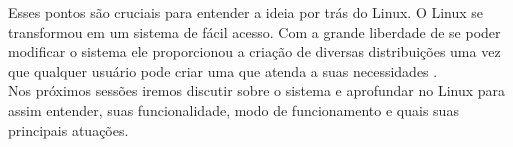 Esses pontos são cruciais para entender a ideia por trás do Linux. O Linux se transformou em um sistema de fácil acesso. Com a grande liberdade de se poder modificar o sistema ele proporcionou a criação de diversas distribuições uma vez que qualquer usuário pode criar uma que atenda a suas necessidades \cite{LinuxFundationWIL}.\\
Nos próximos sessões  iremos discutir sobre o sistema e aprofundar no Linux para assim entender, suas funcionalidade, modo de funcionamento e  quais suas principais atuações.\\














